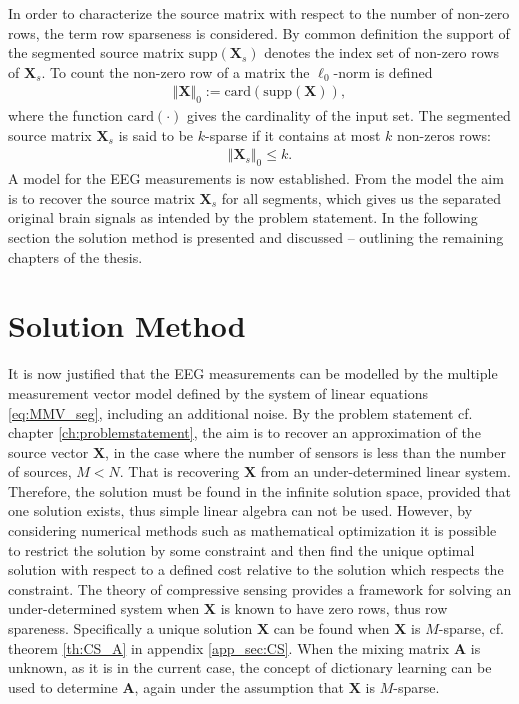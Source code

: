 In order to characterize the source matrix with respect to the number of non-zero rows, the term row sparseness is considered. 
By common definition the support of the segmented source matrix $\text{supp}(\mathbf{X}_s)$ denotes the index set of non-zero rows of $\mathbf{X}_s$.
To count the non-zero row of a matrix the $\ell_0$-norm is defined 
\begin{align*}
\Vert \mathbf{X} \Vert_0 := \text{card}(\text{supp}(\mathbf{X})),
\end{align*}
where the function $\text{card}(\cdot)$ gives the cardinality of the input set. The segmented source matrix $\textbf{X}_s$ is said to be $k$-sparse if it contains at most $k$ non-zeros rows:
\begin{align*}
\Vert \mathbf{X}_s \Vert_0 \leq k.
\end{align*}
A model for the EEG measurements is now established.
From the model the aim is to recover the source matrix $\mathbf{X}_s$ for all segments, which gives us the separated original brain signals as intended by the problem statement. 
In the following section the solution method is presented and discussed -- outlining the remaining chapters of the thesis. 

\section{Solution Method}\label{sec:sol_met}
It is now justified that the EEG measurements can be modelled by the multiple measurement vector model defined by the system of linear equations \eqref{eq:MMV_seg}, including an additional noise.
By the problem statement cf. chapter \ref{ch:problemstatement}, the aim is to recover an approximation of the source vector $\mathbf{X}$, in the case where the number of sensors is less than the number of sources, $M < N$. 
That is recovering $\mathbf{X}$ from an under-determined linear system. 
Therefore, the solution must be found in the infinite solution space, provided that one solution exists, thus simple linear algebra can not be used. 
However, by considering numerical methods such as mathematical optimization it is possible to restrict the solution by some constraint and then find the unique optimal solution with respect to a defined cost relative to the solution which respects the constraint.
The theory of compressive sensing provides a framework for solving an under-determined system when $\mathbf{X}$ is known to have zero rows, thus row spareness. 
Specifically a unique solution $\mathbf{X}$ can be found when $\mathbf{X}$ is $M$-sparse, cf. theorem \ref{th:CS_A} in appendix \ref{app_sec:CS}. 
When the mixing matrix $\mathbf{A}$ is unknown, as it is in the current case, the concept of dictionary learning can be used to determine $\mathbf{A}$, again under the assumption that $\mathbf{X}$ is $M$-sparse.  

